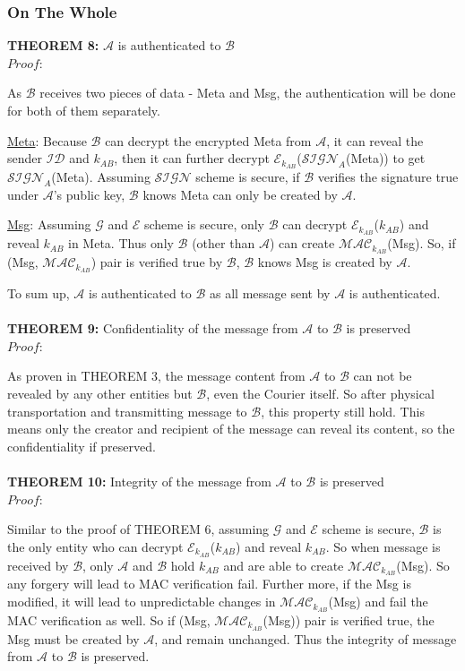 \subsubsection*{On The Whole}
\textbf{THEOREM 8:} $\mathcal{A}$ is authenticated to $\mathcal{B}$ \\
\emph{$Proof:$} \par
As $\mathcal{B}$ receives two pieces of data - Meta and Msg, the authentication will be done for both of them separately.\par
\underline{Meta}: Because $\mathcal{B}$ can decrypt the encrypted Meta from $\mathcal{A}$, it can reveal the sender $\mathcal{ID}$ and $k_{AB}$, then it can further decrypt $\mathcal{E}_{k_{AB}}$($\mathcal{SIGN}_A$(Meta)) to get $\mathcal{SIGN}_A$(Meta). Assuming $\mathcal{SIGN}$ scheme is secure, if $\mathcal{B}$ verifies the signature true under $\mathcal{A}$'s public key, $\mathcal{B}$ knows Meta can only be created by $\mathcal{A}$. \par
\underline{Msg}: Assuming $\mathcal{G}$ and $\mathcal{E}$ scheme is secure, only $\mathcal{B}$ can decrypt $\mathcal{E}_{k_{AB}}$($k_{AB}$) and reveal $k_{AB}$ in Meta. Thus only $\mathcal{B}$ (other than $\mathcal{A}$) can create $\mathcal{MAC}_{k_{AB}}$(Msg). So, if (Msg, $\mathcal{MAC}_{k_{AB}}$) pair is verified true by $\mathcal{B}$, $\mathcal{B}$ knows Msg is created by $\mathcal{A}$. \par
To sum up, $\mathcal{A}$ is authenticated to $\mathcal{B}$ as all message sent by $\mathcal{A}$ is authenticated.
\\
\\
\textbf{THEOREM 9:} Confidentiality of the message from $\mathcal{A}$ to $\mathcal{B}$ is preserved\\
\emph{$Proof:$} \par
As proven in THEOREM 3, the message content from $\mathcal{A}$ to $\mathcal{B}$ can not be revealed by any other entities but $\mathcal{B}$, even the Courier itself. So after physical transportation and transmitting message to $\mathcal{B}$, this property still hold. This means only the creator and recipient of the message can reveal its content, so the confidentiality if preserved.
\\
\\
\textbf{THEOREM 10:} Integrity of the message from $\mathcal{A}$ to $\mathcal{B}$ is preserved\\
\emph{$Proof:$} \par
Similar to the proof of THEOREM 6, assuming $\mathcal{G}$ and $\mathcal{E}$ scheme is secure, $\mathcal{B}$ is the only entity who can decrypt $\mathcal{E}_{k_{AB}}$($k_{AB}$) and reveal $k_{AB}$. So when message is received by $\mathcal{B}$, only $\mathcal{A}$ and $\mathcal{B}$ hold $k_{AB}$ and are able to create $\mathcal{MAC}_{k_{AB}}$(Msg). So any forgery will lead to MAC verification fail. Further more, if the Msg is modified, it will lead to unpredictable changes in $\mathcal{MAC}_{k_{AB}}$(Msg) and fail the MAC verification as well. So if (Msg, $\mathcal{MAC}_{k_{AB}}$(Msg)) pair is verified true, the Msg must be created by $\mathcal{A}$, and remain unchanged. Thus the integrity of message from $\mathcal{A}$ to $\mathcal{B}$ is preserved.
